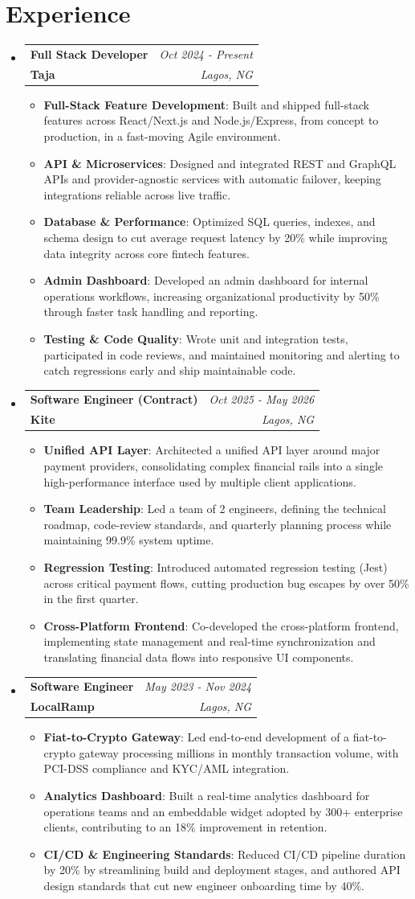 \documentclass[a4paper]{article}
\makeatletter
\newcommand{\resumeItem}[2]{ \item\small{ \textbf{#1}: #2 } }
\newcommand{\resumeJobHeading}[4]{ %
\vspace{2pt}
\item[]
\begin{tabular*}{0.97\textwidth}{l@{\extracolsep{\fill}}r}
	\textbf{#1} & \textit{#3} \\
	\textbf{#4} & \textit{#2} \\
\end{tabular*}
\vspace{0pt}
}
\newcommand{\resumeSubHeadingListStart}{\begin{itemize}[leftmargin=*,topsep=1pt]}
\newcommand{\resumeSubHeadingListEnd}{\end{itemize}}
\newcommand{\resumeItemListStart}{\begin{itemize}[topsep=0pt,itemsep=0pt,parsep=0pt]}
\newcommand{\resumeItemListEnd}{\end{itemize}}
\makeatother
\begin{document}
	\vspace{4pt}
	\section{Experience}
	\resumeSubHeadingListStart
	\resumeJobHeading{Full Stack Developer}{Lagos, NG}{Oct 2024 - Present}{Taja}
	\resumeItemListStart
	\resumeItem{Full-Stack Feature Development}
	{Built and shipped full-stack features across React/Next.js and Node.js/Express, from concept to production, in a fast-moving Agile environment.}
	\resumeItem{API \& Microservices}
	{Designed and integrated REST and GraphQL APIs and provider-agnostic services with automatic failover, keeping integrations reliable across live traffic.}
	\resumeItem{Database \& Performance}
	{Optimized SQL queries, indexes, and schema design to cut average request latency by 20\% while improving data integrity across core fintech features.}
	\resumeItem{Admin Dashboard}
	{Developed an admin dashboard for internal operations workflows, increasing organizational productivity by 50\% through faster task handling and reporting.}
	\resumeItem{Testing \& Code Quality}
	{Wrote unit and integration tests, participated in code reviews, and maintained monitoring and alerting to catch regressions early and ship maintainable code.}
	\resumeItemListEnd

	\resumeJobHeading{Software Engineer (Contract)}{Lagos, NG}{Oct 2025 - May 2026}{Kite}
	\resumeItemListStart
	\resumeItem{Unified API Layer}
	{Architected a unified API layer around major payment providers, consolidating complex financial rails into a single high-performance interface used by multiple client applications.}
	\resumeItem{Team Leadership}
	{Led a team of 2 engineers, defining the technical roadmap, code-review standards, and quarterly planning process while maintaining 99.9\% system uptime.}
	\resumeItem{Regression Testing}
	{Introduced automated regression testing (Jest) across critical payment flows, cutting production bug escapes by over 50\% in the first quarter.}
	\resumeItem{Cross-Platform Frontend}
	{Co-developed the cross-platform frontend, implementing state management and real-time synchronization and translating financial data flows into responsive UI components.}
	\resumeItemListEnd

	\resumeJobHeading{Software Engineer}{Lagos, NG}{May 2023 - Nov 2024}{LocalRamp}
	\resumeItemListStart
	\resumeItem{Fiat-to-Crypto Gateway}
	{Led end-to-end development of a fiat-to-crypto gateway processing millions in monthly transaction volume, with PCI-DSS compliance and KYC/AML integration.}
	\resumeItem{Analytics Dashboard}
	{Built a real-time analytics dashboard for operations teams and an embeddable widget adopted by 300+ enterprise clients, contributing to an 18\% improvement in retention.}
	\resumeItem{CI/CD \& Engineering Standards}
	{Reduced CI/CD pipeline duration by 20\% by streamlining build and deployment stages, and authored API design standards that cut new engineer onboarding time by 40\%.}
	\resumeItemListEnd
	\resumeSubHeadingListEnd
\end{document}
